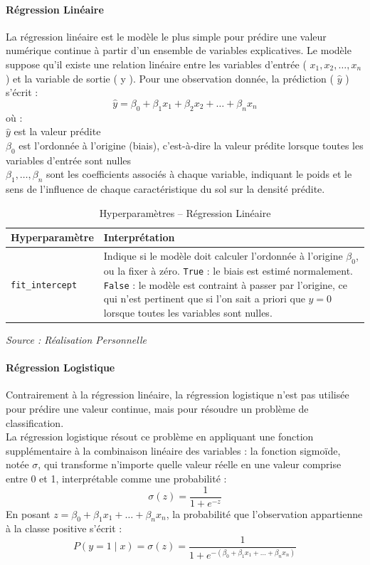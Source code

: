 \documentclass[a4paper,12pt, oneside]{article}
\begin{document}
\paragraph{Régression Linéaire\\}

La régression linéaire est le modèle le plus simple pour prédire une valeur numérique continue à partir d'un ensemble de variables explicatives. Le modèle suppose qu'il existe une relation linéaire entre les variables d'entrée ( $x_1, x_2, \dots, x_n$ ) et la variable de sortie ( y ). Pour une observation donnée, la prédiction ( $\hat{y}$ ) s'écrit :
\[
\hat{y} = \beta_0 + \beta_1 x_1 + \beta_2 x_2 + \dots + \beta_n x_n
\]
où :\\
$\hat{y}$ est la valeur prédite\\
$\beta_0$ est l'ordonnée à l'origine (biais), c'est-à-dire la valeur prédite lorsque toutes les variables d'entrée sont nulles\\
$\beta_1, \dots, \beta_n$ sont les coefficients associés à chaque variable, indiquant le poids et le sens de l'influence de chaque caractéristique du sol sur la densité prédite.\\

\begin{table}[H]
\centering
\begin{tabular}{|m{5cm}|m{12cm}|}
\hline
\textbf{Hyperparamètre} & \textbf{Interprétation} \\
\hline
\texttt{fit\_intercept} & Indique si le modèle doit calculer l'ordonnée à l'origine $\beta_0$, ou la fixer à zéro. \texttt{True} : le biais est estimé normalement. \newline \texttt{False} : le modèle est contraint à passer par l'origine, ce qui n'est pertinent que si l'on sait a priori que $y=0$ lorsque toutes les variables sont nulles. \\
\hline
\end{tabular}
\caption{Hyperparamètres -- Régression Linéaire}
\textit{Source : Réalisation Personnelle}
\end{table}

\paragraph{Régression Logistique\\}
Contrairement à la régression linéaire, la régression logistique n'est pas utilisée pour prédire une valeur continue, mais pour résoudre un problème de classification.\\
La régression logistique résout ce problème en appliquant une fonction supplémentaire à la combinaison linéaire des variables : la fonction sigmoïde, notée $ \sigma $, qui transforme n'importe quelle valeur réelle en une valeur comprise entre 0 et 1, interprétable comme une probabilité :
\[
\sigma(z) = \frac{1}{1 + e^{-z}}
\]
En posant $ z = \beta_0 + \beta_1 x_1 + \dots + \beta_n x_n $, la probabilité que l'observation appartienne à la classe positive s'écrit :
\[
P(y = 1 \mid x) = \sigma(z) = \frac{1}{1 + e^{-(\beta_0 + \beta_1 x_1 + \dots + \beta_n x_n)}}
\]
\end{document}
